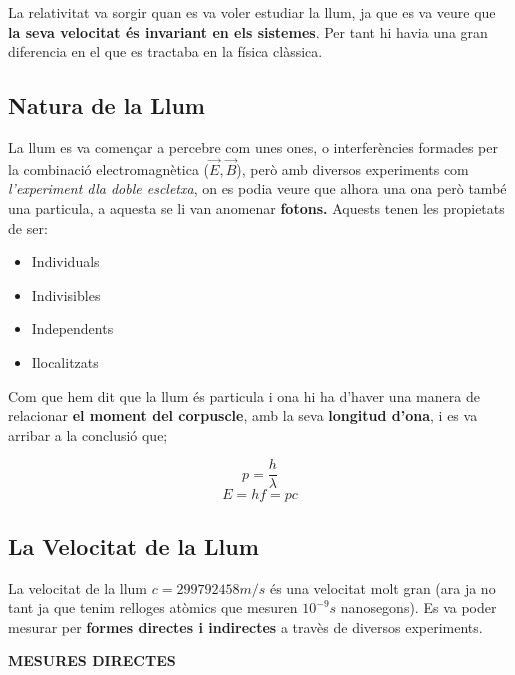 \documentclass[12pt]{article}
\begin{document}
La relativitat va sorgir quan es va voler estudiar la llum, ja que es va veure que \textbf{la seva velocitat és invariant en els sistemes}. Per tant hi havia una gran diferencia en el que es tractaba en la física clàssica. 

\subsection{Natura de la Llum}

La llum es va començar a percebre com unes ones, o interferències formades per la combinació electromagnètica ($\vec{E}, \vec{B}$), però amb diversos experiments com \textit{l'experiment dla doble escletxa}, on es podia veure que alhora una ona però també una particula, a aquesta se li van anomenar \textbf{fotons.} Aquests tenen les propietats de ser:

\begin{itemize}
  \item Individuals
  \item Indivisibles
  \item Independents
  \item Ilocalitzats
\end{itemize}

Com que hem dit que la llum és particula i ona hi ha d'haver una manera de relacionar \textbf{el moment del corpuscle}, amb la seva \textbf{longitud d'ona}, i es va arribar a la conclusió que;

\[p = \frac{h}{\lambda}\]
\[E = hf = pc\]

\subsection{La Velocitat de la Llum}

La velocitat de la llum $c = 299792458 m/s$ és una velocitat molt gran (ara ja no tant ja que tenim relloges atòmics que mesuren $10^{-9}s$ nanosegons). Es va poder mesurar per \textbf{formes directes i indirectes} a travès de diversos experiments.

\noindent \textbf{MESURES DIRECTES}
\end{document}
